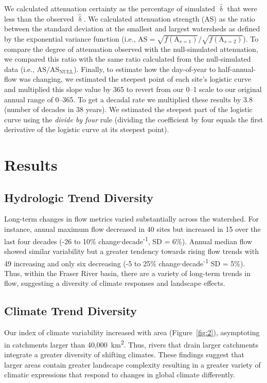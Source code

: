 \documentclass[draft,linenumbers]{AGUJournal}
\begin{document}
We calculated attenuation certainty as the percentage of simulated $\hat{\updelta}$ that were less than the observed $\hat{\updelta}$. We calculated attenuation strength ($\mathrm{AS}$) as the ratio between the standard deviation at the smallest and largest watersheds as defined by the exponential variance function (i.e., $\mathrm{AS}=\sqrt{f(\mathrm{A}_{s=1})} / \sqrt{f(\mathrm{A}_{s=2})}$). To compare the degree of attenuation observed with the null-simulated attenuation, we compared this ratio with the same ratio calculated from the null-simulated data (i.e., $\mathrm{AS} / \mathrm{AS_{NULL}}$). Finally, to estimate how the day-of-year to half-annual-flow was changing, we estimated the steepest point of each site's logistic curve and multiplied this slope value by 365 to revert from our 0--1 scale to our original annual range of 0--365. To get a decadal rate we multiplied these results by 3.8 (number of decades in 38 years). We estimated the steepest part of the logistic curve using the \textit{divide by four} rule \citep{Gelman:2008} (dividing the coefficient by four equals the first derivative of the logistic curve at its steepest point).

\section{Results}

\subsection{Hydrologic Trend Diversity}

Long-term changes in flow metrics varied substantially across the watershed. For instance, annual maximum flow decreased in 40 sites but increased in 15 over the last four decades (-26 to 10\% change$\cdot$decade\textsuperscript{-1}, SD = 6\%). Annual median flow showed similar variability but a greater tendency towards rising flow trends with 49 increasing and only six decreasing (-5 to 25\% change$\cdot$decade\textsuperscript{-1} SD = 5\%). Thus, within the Fraser River basin, there are a variety of long-term trends in flow, suggesting a diversity of climate responses and landscape effects.

\subsection{Climate Trend Diversity}

Our index of climate variability increased with area (Figure~\ref{fig:2}), asymptoting in catchments larger than 40,000~km\textsuperscript{2}. Thus, rivers that drain larger catchments integrate a greater diversity of shifting climates. These findings suggest that larger areas contain greater landscape complexity resulting in a greater variety of climatic expressions that respond to changes in global climate differently.
\end{document}
